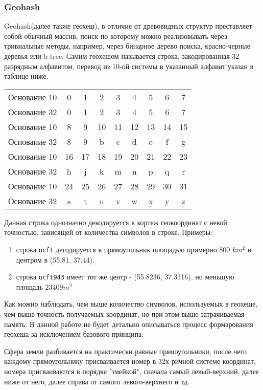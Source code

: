 \subsubsection{Geohash}
Geohash(далее также геохеш), в отличие от древовидных структур преставляет собой обычный массив, поиск по которому можно реализовывать через тривиальные методы, например, через бинарное дерево поиска, красно-черные деревья или b-tree.
Самим геохешом называется строка, закодированная 32 разрядным алфавитом, перевод из 10-ой системы в указанный алфавит указан в таблице ниже.
\begin{center}
\begin{tabular}{ c|c c c c c c c c }
 Основание 10 & 0 & 1 & 2 & 3 & 4 & 5 & 6 & 7 \\
 Основание 32 & 0 & 1 & 2 & 3 & 4 & 5 & 6 & 7 \\
  \hline\hline
 Основание 10 & 8 & 9 & 10 & 11 & 12 & 13 & 14 & 15 \\
 Основание 32 & 8 & 9 & b & c & d & e & f & g \\
  \hline\hline
 Основание 10 & 16 & 17 & 18 & 19 & 20 & 21 & 22 & 23  \\
 Основание 32 & h & j & k & m & n & p & q & r \\
  \hline\hline
 Основание 10 & 24 & 25 & 26 & 27 & 28 & 29 & 30 & 31 \\
 Основание 32 & s & t & u & v & w & x & y & z \\
\end{tabular}
\end{center}
Данная строка однозначно декодируется в кортеж геокоординат с некой точностью, зависящей от количества символов в строке. Примеры:
\begin{enumerate}
    \item строка \texttt{ucft} дегодируется в прямоугольник площадью примерно 800 $ km^2 $ и центром в (55.81, 37.44).
    \item строка \texttt{ucft943} имеет тот же центр - (55.8236, 37.3116), но меньшую площадь $23409 m^2$
\end{enumerate}
Как можно наблюдать, чем выше количество символов, используемых в геохеше, чем выше точность получаемых координат, но при этом выше затрачиваемая память.
В данной работе не будет детально описываться процесс формарования геохеша за исключением базового принципа:

Сфера земли разбивается на практически равные прямоугольники, после чего каждому прямоугольнику присваивается номер в 32х ричной системе координат, номера присваиваются в порядке "змейкой", сначала самый левый-верхний, далее ниже от него, далее справа от самого левого-верхнего и тд.

